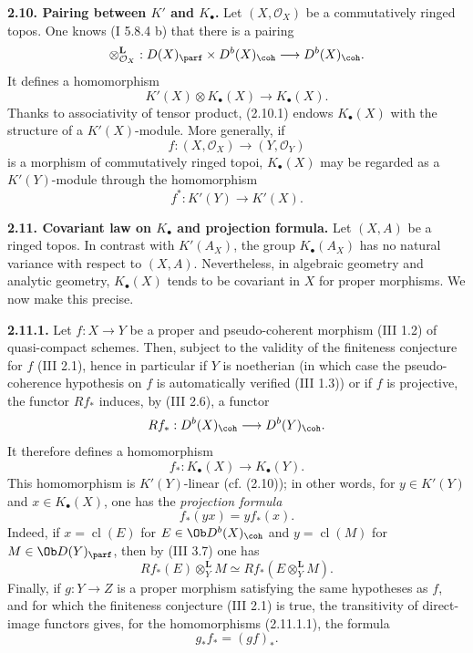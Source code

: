\documentclass[11pt]{article}
\newcommand{\cl}{\operatorname{cl}}
\begin{document}
\textbf{2.10. Pairing between \(K'\) and \(K_{\bullet}\).} Let \((X,\mathcal O_X)\) be a commutatively ringed topos. One knows (I 5.8.4 b) that there is a pairing
\[
 \otimes_{\mathcal O_X}^{\mathbf L}:D(X)_{\parf}\times D^b(X)_{\coh}
 \longrightarrow D^b(X)_{\coh}.
\]
It defines a homomorphism
\begin{equation}\tag{2.10.1}
 K'(X)\otimes K_{\bullet}(X)\longrightarrow K_{\bullet}(X).
\end{equation}
Thanks to associativity of tensor product, (2.10.1) endows \(K_{\bullet}(X)\) with the structure of a \(K'(X)\)-module. More generally, if
\[
 f:(X,\mathcal O_X)\longrightarrow (Y,\mathcal O_Y)
\]
is a morphism of commutatively ringed topoi, \(K_{\bullet}(X)\) may be regarded as a \(K'(Y)\)-module through the homomorphism
\[
 f^*:K'(Y)\longrightarrow K'(X).
\]

\textbf{2.11. Covariant law on \(K_{\bullet}\) and projection formula.} Let \((X,A)\) be a ringed topos. In contrast with \(K'(A_X)\), the group \(K_{\bullet}(A_X)\) has no natural variance with respect to \((X,A)\). Nevertheless, in algebraic geometry and analytic geometry, \(K_{\bullet}(X)\) tends to be covariant in \(X\) for proper morphisms. We now make this precise.

\textbf{2.11.1.} Let \(f:X\to Y\) be a proper and pseudo-coherent morphism (III 1.2) of quasi-compact schemes. Then, subject to the validity of the finiteness conjecture for \(f\) (III 2.1), hence in particular if \(Y\) is noetherian (in which case the pseudo-coherence hypothesis on \(f\) is automatically verified (III 1.3)) or if \(f\) is projective, the functor \(Rf_*\) induces, by (III 2.6), a functor
\[
 Rf_*:D^b(X)_{\coh}\longrightarrow D^b(Y)_{\coh}.
\]
It therefore defines a homomorphism
\begin{equation}\tag{2.11.1.1}
 f_*:K_{\bullet}(X)\longrightarrow K_{\bullet}(Y).
\end{equation}
This homomorphism is \(K'(Y)\)-linear (cf. (2.10)); in other words, for \(y\in K'(Y)\) and \(x\in K_{\bullet}(X)\), one has the \emph{projection formula}
\begin{equation}\tag{2.11.1.2}
 f_*(yx)=y f_*(x).
\end{equation}
Indeed, if \(x=\cl(E)\) for \(E\in\Ob D^b(X)_{\coh}\) and \(y=\cl(M)\) for \(M\in\Ob D(Y)_{\parf}\), then by (III 3.7) one has
\[
 Rf_*(E)\otimes_Y^{\mathbf L}M\simeq
 Rf_*(E\otimes_Y^{\mathbf L}M).
\]
Finally, if \(g:Y\to Z\) is a proper morphism satisfying the same hypotheses as \(f\), and for which the finiteness conjecture (III 2.1) is true, the transitivity of direct-image functors gives, for the homomorphisms (2.11.1.1), the formula
\begin{equation}\tag{2.11.1.3}
 g_*f_*=(gf)_*.
\end{equation}
\end{document}
